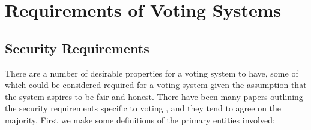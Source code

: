 
\chapter{Requirements of Voting Systems}
\label{ch:req}

\section{Security Requirements}
\label{ch:req:sec}

There are a number of desirable properties for a voting system to have, some of which could be considered required for a voting system given the assumption that the system aspires to be fair and honest. There have been many papers outlining the security requirements specific to voting \cite{epsteinElectronicVoting2007,delauneFormalisingSecurityProperties2010,liTaxonomyComparisonRemote2014,hastingsSecurityConsiderationsRemote2011}, and they tend to agree on the majority. First we make some definitions of the primary entities involved:

